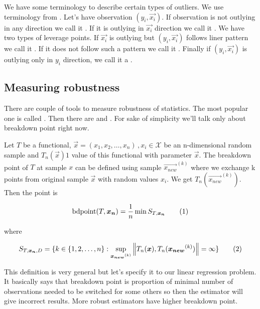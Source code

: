 We have some terminology to describe certain types of outliers. We use terminology from \cite{rouss:1990}. Let's have observation $(y_i, \vec{x_i})$. If observation is not outlying in any direction we call it  . If it is outlying in $\vec{x_i}$ direction we call it . We have two types of leverage points. If $\vec{x_i}$ is outlying but $(y_i, \vec{x_i})$ follows liner pattern we call it  . If it does not follow such a pattern we call it . Finally if $(y_i, \vec{x_i})$ is  outlying only in $y_i$  direction, we call it a .

\subsection{Measuring robustness}
There are couple of tools to measure robustness of statistics. The most popular one is called . Then there are  and . For sake of simplicity we'll talk only about breakdown point right now. 

\begin{definition}
    Let $T$ be a functional, $\vec{x} = (x_1, x_2,\ldots,x_n)\,, x_i \in \mathcal{X}$ be an n-dimensional random sample and $T_n(\vec{x})1$ value of this functional with parameter $\vec{x}$. The breakdown point of $T$ at sample $x$ can be defined using sample $\vec{x_{new}}^(k)$ where we exchange k points from original sample $\vec{x}$ with random values $x_i$. We get $T_n(\vec{x_{new}}^{(k)})$. Then the  point is 


\begin{equation}
    \bdpoint(T,\vec{x_n} ) = \frac{1}{n} \min S_{T, \vec{x_n}}  \numberthis
\end{equation}

where 

\begin{equation}
   S_{T, \vec{x_n}, D} =   \{{k \in \{{1,2, \ldots ,n\}} : \sup_{ \vec{x_{new}}^{(k)} } \norm{T_n(\vec{x}), T_n(\vec{x_{new}}^{(k)})} = \infty   \}}   \numberthis
\end{equation}


\end{definition}

This definition is very general but let's specify it to our linear regression problem. It basically says that breakdown point is proportion of minimal number of observations needed to be switched for some others so then the estimator will give incorrect results. More robust estimators have higher breakdown point. 

